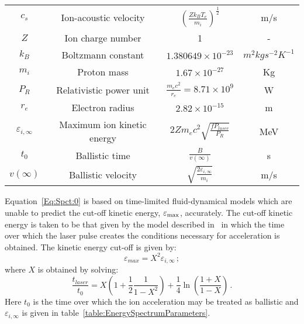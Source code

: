 \begin{table}
\begin{center}
\begin{tabular}{c c c c}
      $c_{s}$ & Ion-acoustic velocity & $(\frac{Z k_{B} T_{e}}{m_{i}})^{\frac{1}{2}}$ & m/s \\  
      $Z$ & Ion charge number & 1 & - \\  
      $k_{B}$ & Boltzmann constant & $1.380649 \times 10^{-23}$ & $m^{2} kg s^{-2} K^{-1}$ \\  
      $m_{i}$ & Proton mass & $1.67 \times 10^{-27}$ & Kg \\ 
      $P_{R}$ & Relativistic power unit & $\frac{m_{e} c^{2}}{r_{e}} = 8.71 \times 10^{9}$ & W \\  
      $r_{e}$ & Electron radius & $2.82 \times 10^{-15}$ & m \\  
      $\varepsilon_{i,\infty}$ & Maximum ion kinetic energy & $2 Z m_{e} c^{2} \sqrt{\frac{f P_{laser}}{P_{R}}}$ & MeV \\  
      $t_{0}$ & Ballistic time & $\frac{B}{v(\infty)}$ & s \\  
      $v(\infty)$ & Ballistic velocity & $\sqrt{\frac{2 \varepsilon_{i,\infty}}{m_{i}}}$ & m/s \\  
      \hline
    \end{tabular}
  \end{center}
\end{table}

Equation~\ref{Eq:Spct:0} is based on time-limited fluid-dynamical
models which are unable to predict the cut-off kinetic energy,
$\varepsilon_{\rm max}$, accurately.
The cut-off kinetic energy is taken to be that given by the model
described in~\cite{10.1103/PhysRevLett.97.045005} in which the time
over which the laser pulse creates the conditions necessary for
acceleration is obtained. 
The kinetic energy cut-off is given by:
\begin{equation}
  \varepsilon_{max} = X^{2} \varepsilon_{i,\infty} \, ;
  \label{eq:Eq:Spct:2}
\end{equation}
where $X$ is obtained by solving:
\begin{equation}
  \frac{t_{laser}}{t_{0}} = X \left( 1 + \frac{1}{2}
                           \frac{1}{1 - X^{2}} \right) +
                           \frac{1}{4} \ln \left( \frac{1+X}{1-X} \right) \, .
  \label{eq:Eq:Spct:1}
\end{equation}
Here $t_0$ is the time over which the ion acceleration may be treated
as ballistic and $\varepsilon_{i,\infty}$ is given in
table~\ref{table:EnergySpectrumParameters}.

